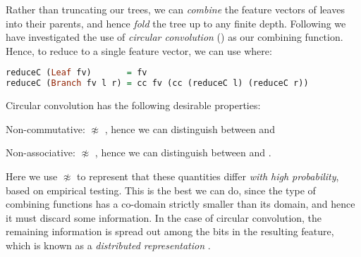 \iffalse

We can do this with \hs{tabulate w d t}:

\begin{lstlisting}[language=Haskell, xleftmargin=.2\textwidth, xrightmargin=.2\textwidth]
tabulate w d t = take d (map (take w) (tabulate' t))

tabulate' (Leaf   fv)     = [fv] : []
tabulate' (Branch fv l r) = [fv] : merge (tabulate' l) (tabulate' r)

merge    []     ys  = ys
merge    xs     []  = xs
merge (x:xs) (y:ys) = (x ++ y) : merge xs ys
\end{lstlisting}

\fi

Rather than truncating our trees, we can \emph{combine} the feature vectors of leaves into their parents, and hence \emph{fold} the tree up to any finite depth. Following \citep{zanzotto2012distributed} we have investigated the use of \emph{circular convolution} () as our combining function. Hence, to reduce  to a single feature vector, we can use  where:

\begin{lstlisting}[language=Haskell, xleftmargin=.2\textwidth, xrightmargin=.2\textwidth]
reduceC (Leaf fv)       = fv
reduceC (Branch fv l r) = cc fv (cc (reduceC l) (reduceC r))
\end{lstlisting}

Circular convolution has the following desirable properties:

\begin{description}

  \item{Non-commutative}:  $\not\approx$ , hence we can distinguish between  and 

  \item{Non-associative}:  $\not\approx$ , hence we can distinguish between  and .

\end{description}

Here we use $\not\approx$ to represent that these quantities differ \emph{with high probability}, based on empirical testing. This is the best we can do, since the type of combining functions  has a co-domain strictly smaller than its domain, and hence it must discard some information. In the case of circular convolution, the remaining information is spread out among the bits in the resulting feature, which is known as a \emph{distributed representation} \citep{conf/ijcai/Plate91}.

